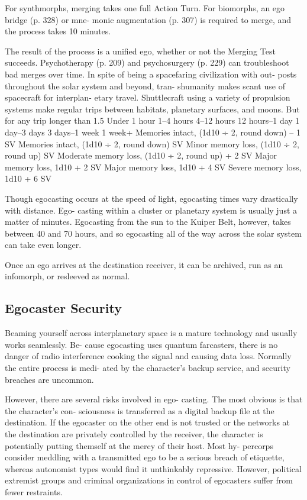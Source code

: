 For synthmorphs, merging takes one full Action 
Turn. For biomorphs, an ego bridge (p. 328) or mne-
monic augmentation (p. 307) is required to merge, 
and the process takes 10 minutes.

The result of the process is a unified ego, whether 
or not the Merging Test succeeds. Psychotherapy (p. 
209) and psychosurgery (p. 229) can troubleshoot bad 
merges over time.
In spite of being a spacefaring civilization with out-
posts throughout the solar system and beyond, tran-
shumanity makes scant use of spacecraft for interplan-
etary travel. Shuttlecraft using a variety of propulsion 
systems make regular trips between habitats, planetary 
surfaces, and moons. But for any trip longer than 1.5 
Under 1 hour
1–4 hours
4–12 hours
12 hours–1 day
1 day–3 days
3 days–1 week
1 week+
Memories intact, (1d10 ÷ 2, round down) – 1 SV
Memories intact, (1d10 ÷ 2, round down) SV
Minor memory loss, (1d10 ÷ 2, round up) SV
Moderate memory loss, (1d10 ÷ 2, round up) + 2 SV
Major memory loss, 1d10 + 2 SV
Major memory loss, 1d10 + 4 SV
Severe memory loss, 1d10 + 6 SV

Though egocasting occurs at the speed of light, 
egocasting times vary drastically with distance. Ego-
casting within a cluster or planetary system is usually 
just a matter of minutes. Egocasting from the sun to 
the Kuiper Belt, however, takes between 40 and 70 
hours, and so egocasting all of the way across the 
solar system can take even longer.

Once an ego arrives at the destination receiver, it can 
be archived, run as an infomorph, or resleeved as normal.

\subsection{Egocaster Security}

Beaming yourself across interplanetary space is a 
mature technology and usually works seamlessly. Be-
cause egocasting uses quantum farcasters, there is no 
danger of radio interference cooking the signal and 
causing data loss. Normally the entire process is medi-
ated by the character's backup service, and security 
breaches are uncommon.

However, there are several risks involved in ego-
casting. The most obvious is that the character's con-
sciousness is transferred as a digital backup file at the 
destination. If the egocaster on the other end is not 
trusted or the networks at the destination are privately 
controlled by the receiver, the character is potentially 
putting themself at the mercy of their host. Most hy-
percorps consider meddling with a transmitted ego to 
be a serious breach of etiquette, whereas autonomist 
types would find it unthinkably repressive. However, 
political extremist groups and criminal organizations 
in control of egocasters suffer from fewer restraints.

